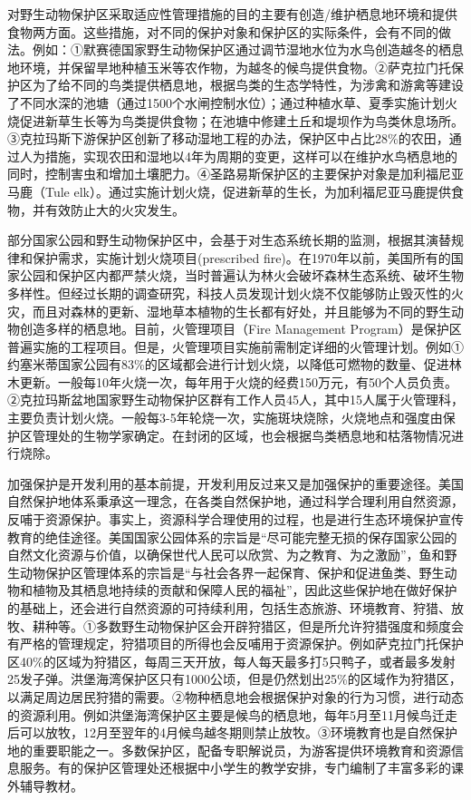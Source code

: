 \documentclass[
]{book}
\begin{document}
对野生动物保护区采取适应性管理措施的目的主要有创造/维护栖息地环境和提供食物两方面。这些措施，对不同的保护对象和保护区的实际条件，会有不同的做法。例如：①默赛德国家野生动物保护区通过调节湿地水位为水鸟创造越冬的栖息地环境，并保留旱地种植玉米等农作物，为越冬的候鸟提供食物。②萨克拉门托保护区为了给不同的鸟类提供栖息地，根据鸟类的生态学特性，为涉禽和游禽等建设了不同水深的池塘（通过1500个水闸控制水位）；通过种植水草、夏季实施计划火烧促进新草生长等为鸟类提供食物；在池塘中修建土丘和堤坝作为鸟类休息场所。③克拉玛斯下游保护区创新了移动湿地工程的办法，保护区中占比28\%的农田，通过人为措施，实现农田和湿地以4年为周期的变更，这样可以在维护水鸟栖息地的同时，控制害虫和增加土壤肥力。④圣路易斯保护区的主要保护对象是加利福尼亚马鹿（Tule elk）。通过实施计划火烧，促进新草的生长，为加利福尼亚马鹿提供食物，并有效防止大的火灾发生。

部分国家公园和野生动物保护区中，会基于对生态系统长期的监测，根据其演替规律和保护需求，实施计划火烧项目(prescribed fire)。在1970年以前，美国所有的国家公园和保护区内都严禁火烧，当时普遍认为林火会破坏森林生态系统、破坏生物多样性。但经过长期的调查研究，科技人员发现计划火烧不仅能够防止毁灭性的火灾，而且对森林的更新、湿地草本植物的生长都有好处，并且能够为不同的野生动物创造多样的栖息地。目前，火管理项目（Fire Management Program）是保护区普遍实施的工程项目。但是，火管理项目实施前需制定详细的火管理计划。例如①约塞米蒂国家公园有83\%的区域都会进行计划火烧，以降低可燃物的数量、促进林木更新。一般每10年火烧一次，每年用于火烧的经费150万元，有50个人员负责。②克拉玛斯盆地国家野生动物保护区群有工作人员45人，其中15人属于火管理科，主要负责计划火烧。一般每3-5年轮烧一次，实施斑块烧除，火烧地点和强度由保护区管理处的生物学家确定。在封闭的区域，也会根据鸟类栖息地和枯落物情况进行烧除。

加强保护是开发利用的基本前提，开发利用反过来又是加强保护的重要途径。美国自然保护地体系秉承这一理念，在各类自然保护地，通过科学合理利用自然资源，反哺于资源保护。事实上，资源科学合理使用的过程，也是进行生态环境保护宣传教育的绝佳途径。美国国家公园体系的宗旨是``尽可能完整无损的保存国家公园的自然文化资源与价值，以确保世代人民可以欣赏、为之教育、为之激励''，鱼和野生动物保护区管理体系的宗旨是``与社会各界一起保育、保护和促进鱼类、野生动物和植物及其栖息地持续的贡献和保障人民的福祉''，因此这些保护地在做好保护的基础上，还会进行自然资源的可持续利用，包括生态旅游、环境教育、狩猎、放牧、耕种等。①多数野生动物保护区会开辟狩猎区，但是所允许狩猎强度和频度会有严格的管理规定，狩猎项目的所得也会反哺用于资源保护。例如萨克拉门托保护区40\%的区域为狩猎区，每周三天开放，每人每天最多打5只鸭子，或者最多发射25发子弹。洪堡海湾保护区只有1000公顷，但是仍然划出25\%的区域作为狩猎区，以满足周边居民狩猎的需要。②物种栖息地会根据保护对象的行为习惯，进行动态的资源利用。例如洪堡海湾保护区主要是候鸟的栖息地，每年5月至11月候鸟迁走后可以放牧，12月至翌年的4月候鸟越冬期则禁止放牧。③环境教育也是自然保护地的重要职能之一。多数保护区，配备专职解说员，为游客提供环境教育和资源信息服务。有的保护区管理处还根据中小学生的教学安排，专门编制了丰富多彩的课外辅导教材。
\end{document}
